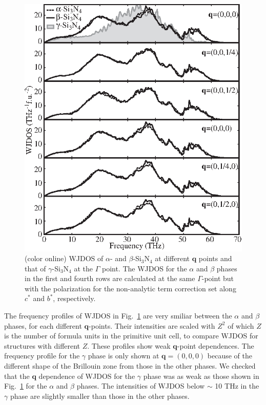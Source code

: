\documentclass[twocolumn,amsmath,amssymb,a4paper,prb,superscriptaddress,floatfix]{revtex4-1}
\begin{document}
\begin{figure}[ht]
 \centering
  \includegraphics[width=0.9\linewidth]{figure_wjdoss_gray.eps} \caption{(color
	  online) WJDOS of $\alpha$- and $\beta$-Si$_3$N$_4$ at different $\mathbf
	  q$ points and that of $\gamma$-Si$_3$N$_4$ at the $\Gamma$ point. 
  The WJDOS for the $\alpha$ and $\beta$ phases in the  first and fourth rows
  are calculated at the same $\Gamma$-point but 
  with the polarization for the non-analytic term correction set along $c^*$ and
  $b^*$, respectively. \label{fig:Fig6_338} }
 \centering
\end{figure}

The frequency profiles of WJDOS in Fig.~\ref{fig:Fig6_338} are very smiliar between the $\alpha$ and
$\beta$ phases, for each different $\mathbf{q}$-points.  Their intensities are
scaled with $Z^2$ of which $Z$ is the number of formula units in the primitive
unit cell, to compare WJDOS for structures with different $Z$.  These profiles
show weak $\mathbf{q}$-point dependences.  The frequency profile for the
$\gamma$ phase is only shown at $\mathbf{q}=(0,0,0)$ because of the different
shape of the Brillouin zone from those in the other phases.  We checked that
the $\mathbf{q}$ dependence of WJDOS for the $\gamma$ phase was as weak as
those shown in Fig.~\ref{fig:Fig6_338} for the $\alpha$ and $\beta$ phases.
The intensities of WJDOS below $\sim$ 10 THz in the $\gamma$ phase are slightly smaller than those in
the other phases. 
\end{document}
